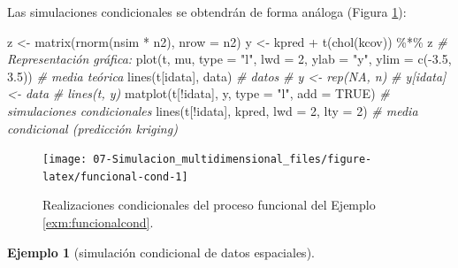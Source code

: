 \documentclass[
]{book}
\newenvironment{Shaded}{\begin{snugshade}}{\end{snugshade}}
\newcommand{\AttributeTok}[1]{\textcolor[rgb]{0.77,0.63,0.00}{#1}}
\newcommand{\CommentTok}[1]{\textcolor[rgb]{0.56,0.35,0.01}{\textit{#1}}}
\newcommand{\ConstantTok}[1]{\textcolor[rgb]{0.00,0.00,0.00}{#1}}
\newcommand{\DecValTok}[1]{\textcolor[rgb]{0.00,0.00,0.81}{#1}}
\newcommand{\FloatTok}[1]{\textcolor[rgb]{0.00,0.00,0.81}{#1}}
\newcommand{\FunctionTok}[1]{\textcolor[rgb]{0.00,0.00,0.00}{#1}}
\newcommand{\NormalTok}[1]{#1}
\newcommand{\OtherTok}[1]{\textcolor[rgb]{0.56,0.35,0.01}{#1}}
\newcommand{\SpecialCharTok}[1]{\textcolor[rgb]{0.00,0.00,0.00}{#1}}
\newcommand{\StringTok}[1]{\textcolor[rgb]{0.31,0.60,0.02}{#1}}
\theoremstyle{break}
\theoremstyle{definition}
\theoremstyle{definition}
\newtheorem{example}{Ejemplo}[chapter]
\theoremstyle{definition}
\theoremstyle{definition}
\theoremstyle{remark}
\begin{document}
Las simulaciones condicionales se obtendrán de forma análoga (Figura \ref{fig:funcional-cond}):



\begin{Shaded}
\begin{Highlighting}[]
\NormalTok{z }\OtherTok{\textless{}{-}} \FunctionTok{matrix}\NormalTok{(}\FunctionTok{rnorm}\NormalTok{(nsim }\SpecialCharTok{*}\NormalTok{ n2), }\AttributeTok{nrow =}\NormalTok{ n2)}
\NormalTok{y }\OtherTok{\textless{}{-}}\NormalTok{ kpred }\SpecialCharTok{+} \FunctionTok{t}\NormalTok{(}\FunctionTok{chol}\NormalTok{(kcov)) }\SpecialCharTok{\%*\%}\NormalTok{ z}
\CommentTok{\# Representación gráfica:}
\FunctionTok{plot}\NormalTok{(t, mu, }\AttributeTok{type =} \StringTok{"l"}\NormalTok{, }\AttributeTok{lwd =} \DecValTok{2}\NormalTok{, }\AttributeTok{ylab =} \StringTok{"y"}\NormalTok{, }\AttributeTok{ylim =} \FunctionTok{c}\NormalTok{(}\SpecialCharTok{{-}}\FloatTok{3.5}\NormalTok{, }\FloatTok{3.5}\NormalTok{)) }\CommentTok{\# media teórica}
\FunctionTok{lines}\NormalTok{(t[idata], data) }\CommentTok{\# datos}
\CommentTok{\# y \textless{}{-} rep(NA, n)}
\CommentTok{\# y[idata] \textless{}{-} data}
\CommentTok{\# lines(t, y)}
\FunctionTok{matplot}\NormalTok{(t[}\SpecialCharTok{!}\NormalTok{idata], y, }\AttributeTok{type =} \StringTok{"l"}\NormalTok{, }\AttributeTok{add =} \ConstantTok{TRUE}\NormalTok{) }\CommentTok{\# simulaciones condicionales}
\FunctionTok{lines}\NormalTok{(t[}\SpecialCharTok{!}\NormalTok{idata], kpred, }\AttributeTok{lwd =} \DecValTok{2}\NormalTok{, }\AttributeTok{lty =} \DecValTok{2}\NormalTok{) }\CommentTok{\# media condicional (predicción kriging)}
\end{Highlighting}
\end{Shaded}

\begin{figure}[!htb]

{\centering \texttt{[image: 07-Simulacion\_multidimensional\_files/figure-latex/funcional-cond-1]} 

}

\caption{Realizaciones condicionales del proceso funcional del Ejemplo \ref{exm:funcionalcond}.}\label{fig:funcional-cond}
\end{figure}

\begin{example}[simulación condicional de datos espaciales]
\protect\hypertarget{exm:unnamed-chunk-12}{}{\label{exm:unnamed-chunk-12} {} }
\end{example}
\end{document}
